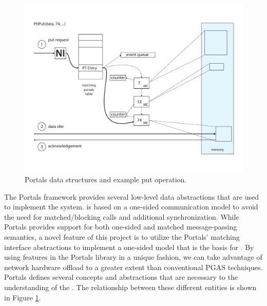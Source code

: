 



\begin{figure}[ht]
  \centering
  \includegraphics[scale=.30]{figs/portals_put}
  \caption{Portals data structures and example put operation.}
  \label{fig:portals_put}
\end{figure}

The Portals framework provides several low-level data abstractions that
are used to implement the \pdht system. \pdht is based on a one-sided
communication model to avoid the need for matched/blocking calls and
additional synchronization. While Portals provides support for both
one-sided and matched message-passing semantics, a novel feature of
this project is to utilize the Portals' matching interface
abstractions to implement a one-sided model that is the basis for
\pdht. By using features in the Portals library in a unique fashion,
we can take advantage of network hardware offload  to a greater extent
than conventional PGAS techniques. Portals defines several concepts
and abstractions that are necessary to the understanding of the
\pdht. The relationship between these different entities is shown in
Figure \ref{fig:portals_put}.

